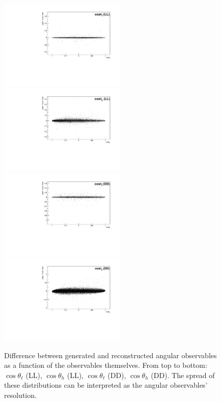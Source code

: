 \begin{figure}
\centering
\includegraphics[width=0.54\textwidth]{Lmumu/figs/resolution/RmT_vs_cosThetaL_LL.pdf}
\includegraphics[width=0.54\textwidth]{Lmumu/figs/resolution/RmT_vs_cosThetaB_LL.pdf}
\includegraphics[width=0.54\textwidth]{Lmumu/figs/resolution/RmT_vs_cosThetaL_DD.pdf}
\includegraphics[width=0.54\textwidth]{Lmumu/figs/resolution/RmT_vs_cosThetaB_DD.pdf}
 \caption{Difference between generated and reconstructed angular observables as a function of the observables themselves.
 From top to bottom: $\cos\theta_\ell$ (LL), $\cos\theta_h$ (LL), $\cos\theta_\ell$ (DD), $\cos\theta_h$ (DD). 
 The spread of these distributions can be interpreted as the angular observables' resolution.
 }
\label{fig:resolutionvsq2ang}
\end{figure}
